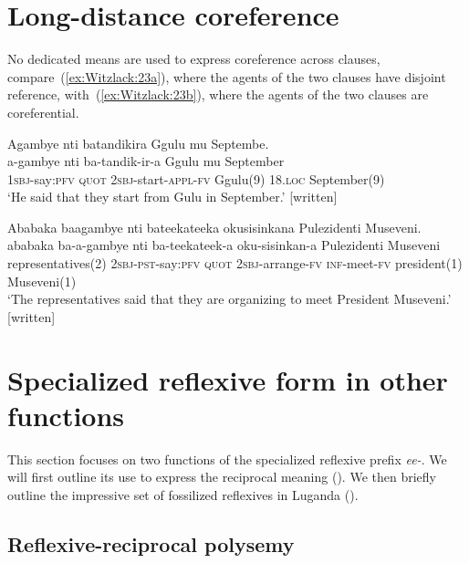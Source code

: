 \documentclass[output=paper,colorlinks,citecolor=brown,
]{langscibook}
\begin{document}
\z
\z


\section{Long-distance coreference}\label{sec:Witzlack:6}

No dedicated means are used to express coreference across clauses, compare~(\ref{ex:Witzlack:23a}), where the agents of the two clauses have disjoint reference, with~(\ref{ex:Witzlack:23b}), where the agents of the two clauses are coreferential.

\ea\label{ex:Witzlack:23}

\ea \label{ex:Witzlack:23a}
    \glll Agambye nti batandikira Ggulu mu Septembe.\\
    a-gambye	nti		ba-tandik-ir-a 	Ggulu	mu	September	 \\
    \textsc{1sbj}-say:\textsc{pfv}	\textsc{quot}	\textsc{2sbj}-start-\textsc{appl}-\textsc{fv}	Ggulu(9)	\textsc{18.loc}	September(9)	\\
    \glt ‘He said that they start from Gulu in September.’ [written] %

\ex \label{ex:Witzlack:23b}
    \glll Ababaka baagambye nti bateekateeka okusisinkana Pulezidenti Museveni.\\
    ababaka	ba-a-gambye nti ba-teekateek-a 	oku-sisinkan-a	Pulezidenti	Museveni\\
    representatives(2)	\textsc{2sbj}-\textsc{pst}-say:\textsc{pfv} \textsc{quot}	\textsc{2sbj}-arrange-\textsc{fv}		\textsc{inf}-meet-\textsc{fv}	president(1)	Museveni(1)\\
    \glt ‘The representatives said that they are organizing to meet President Museveni.’ [written]%

\z
\z


\section{Specialized reflexive form in other functions}\label{sec:Witzlack:7}

This section focuses on two functions of the specialized reflexive prefix \emph{ee-}. 
We will first outline its use to express the reciprocal meaning (). 
We then briefly outline the impressive set of fossilized reflexives in Luganda (). 


\subsection{Reflexive-reciprocal polysemy}\label{sec:Witzlack:7.1}
\end{document}
